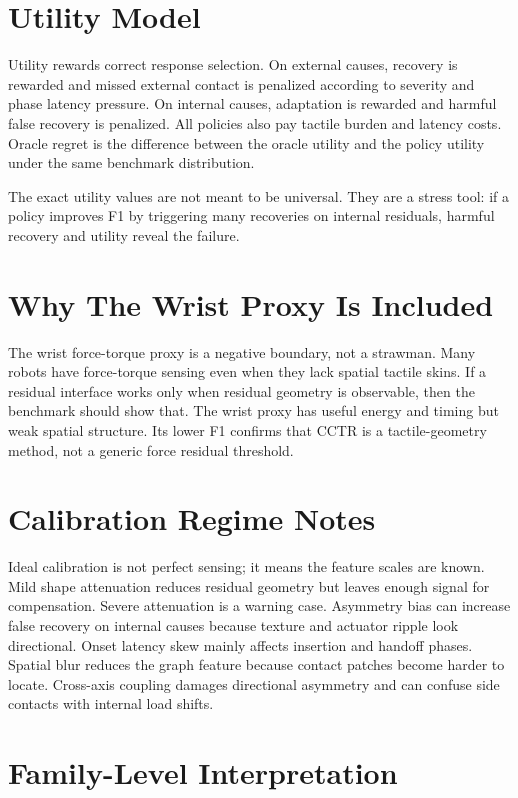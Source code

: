 \documentclass{article}
\newcommand{\method}{CCTR}
\begin{document}
\section{Utility Model}

Utility rewards correct response selection. On external causes, recovery is rewarded and missed external contact is penalized according to severity and phase latency pressure. On internal causes, adaptation is rewarded and harmful false recovery is penalized. All policies also pay tactile burden and latency costs. Oracle regret is the difference between the oracle utility and the policy utility under the same benchmark distribution.

The exact utility values are not meant to be universal. They are a stress tool: if a policy improves F1 by triggering many recoveries on internal residuals, harmful recovery and utility reveal the failure.

\section{Why The Wrist Proxy Is Included}

The wrist force-torque proxy is a negative boundary, not a strawman. Many robots have force-torque sensing even when they lack spatial tactile skins. If a residual interface works only when residual geometry is observable, then the benchmark should show that. The wrist proxy has useful energy and timing but weak spatial structure. Its lower F1 confirms that \method{} is a tactile-geometry method, not a generic force residual threshold.

\section{Calibration Regime Notes}

Ideal calibration is not perfect sensing; it means the feature scales are known. Mild shape attenuation reduces residual geometry but leaves enough signal for compensation. Severe attenuation is a warning case. Asymmetry bias can increase false recovery on internal causes because texture and actuator ripple look directional. Onset latency skew mainly affects insertion and handoff phases. Spatial blur reduces the graph feature because contact patches become harder to locate. Cross-axis coupling damages directional asymmetry and can confuse side contacts with internal load shifts.

\section{Family-Level Interpretation}
\end{document}
